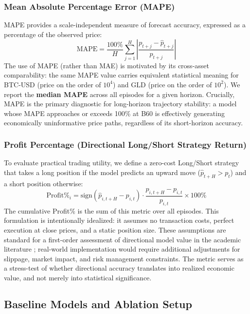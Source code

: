 \documentclass[11pt,a4paper]{article}
\begin{document}
\subsubsection{Mean Absolute Percentage Error (MAPE)}
MAPE provides a scale-independent measure of forecast accuracy, expressed as a percentage of the observed price:
\begin{equation}
    \text{MAPE} = \frac{100\%}{H} \sum_{j=1}^{H} \left| \frac{p_{t+j} - \hat{p}_{t+j}}{p_{t+j}} \right|
\end{equation}
The use of MAPE (rather than MAE) is motivated by its cross-asset comparability: the same MAPE value carries equivalent statistical meaning for BTC-USD (price on the order of $10^4$) and GLD (price on the order of $10^2$). We report the \textbf{median MAPE} across all episodes for a given horizon. Crucially, MAPE is the primary diagnostic for long-horizon trajectory stability: a model whose MAPE approaches or exceeds 100\% at B60 is effectively generating economically uninformative price paths, regardless of its short-horizon accuracy.

\subsubsection{Profit Percentage (Directional Long/Short Strategy Return)}
To evaluate practical trading utility, we define a zero-cost Long/Short strategy that takes a long position if the model predicts an upward move ($\hat{p}_{t+H} > p_t$) and a short position otherwise:
\begin{equation}
    \text{Profit\%}_i = \text{sign}\!\left(\hat{p}_{i,t+H} - p_{i,t}\right) \cdot \frac{p_{i,t+H} - p_{i,t}}{p_{i,t}} \times 100\%
\end{equation}
The cumulative Profit\% is the sum of this metric over all episodes. This formulation is intentionally idealized: it assumes no transaction costs, perfect execution at close prices, and a static position size. These assumptions are standard for a first-order assessment of directional model value in the academic literature \cite{fischer2018deep}; real-world implementation would require additional adjustments for slippage, market impact, and risk management constraints. The metric serves as a stress-test of whether directional accuracy translates into realized economic value, and not merely into statistical significance.

\subsection{Baseline Models and Ablation Setup}
\label{sec:ablation_setup}
\end{document}
